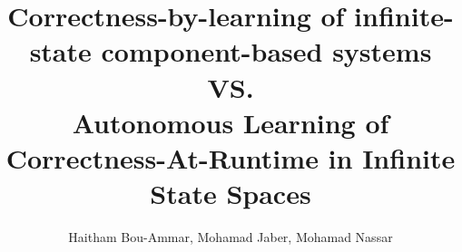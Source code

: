 \title{Correctness-by-learning of infinite-state component-based systems\\
VS.\\
Autonomous Learning  of Correctness-At-Runtime in Infinite State Spaces}

\author{Haitham Bou-Ammar, Mohamad Jaber, Mohamad Nassar}
